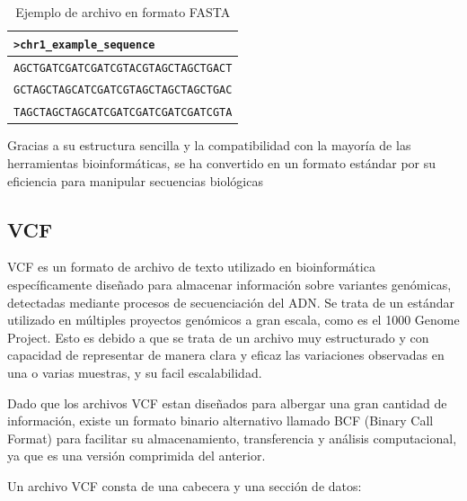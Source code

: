 \documentclass[11pt,spanish,listoffigures,listoftables]{tfgetsinf}
\begin{document}
\begin{table}[H]
   \centering
   \caption{Ejemplo de archivo en formato FASTA}
   \begin{tabular}{|l|}
   \hline
   \texttt{>chr1\_example\_sequence} \\ \hline
   \texttt{AGCTGATCGATCGATCGTACGTAGCTAGCTGACT} \\
   \texttt{GCTAGCTAGCATCGATCGTAGCTAGCTAGCTGAC} \\
   \texttt{TAGCTAGCTAGCATCGATCGATCGATCGATCGTA} \\
   \hline
   \end{tabular}
   \label{tabla:FASTA}
   \end{table}
   

Gracias a su estructura sencilla y la compatibilidad con la mayoría de las herramientas bioinformáticas, se ha convertido en un formato estándar por su eficiencia para manipular secuencias biológicas\cite{GEN}

\subsection{VCF}

VCF es un formato de archivo de texto utilizado en bioinformática específicamente diseñado para almacenar información sobre variantes genómicas, detectadas mediante procesos de secuenciación del ADN. Se trata de un estándar utilizado en múltiples proyectos genómicos a gran escala, como es el 1000 Genome Project\cite{AUT}. Esto es debido a que se trata de un archivo muy estructurado y con capacidad de representar de manera clara y eficaz las variaciones observadas en una o varias muestras, y su facil escalabilidad\cite{EMB}.

Dado que los archivos VCF estan diseñados para albergar una gran cantidad de información, existe un formato binario alternativo llamado BCF (Binary Call Format) para facilitar su almacenamiento, transferencia y análisis computacional, ya que es una versión comprimida del anterior. 

Un archivo VCF consta de una cabecera y una sección de datos: 
\end{document}
